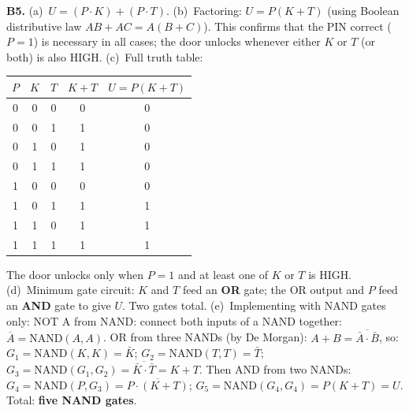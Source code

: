 \textbf{B5.}
(a)~$U=(P\cdot K)+(P\cdot T)$. \quad
(b)~Factoring: $U=P(K+T)$
(using Boolean distributive law $AB+AC=A(B+C)$).
This confirms that the PIN correct ($P=1$) is
necessary in all cases; the door unlocks whenever
either $K$ or $T$ (or both) is also HIGH. \quad
(c)~Full truth table:
\begin{center}
\begin{tabular}{ccc|c|c}
$P$ & $K$ & $T$ & $K+T$ & $U=P(K+T)$\\
\hline
0 & 0 & 0 & 0 & 0\\
0 & 0 & 1 & 1 & 0\\
0 & 1 & 0 & 1 & 0\\
0 & 1 & 1 & 1 & 0\\
1 & 0 & 0 & 0 & 0\\
1 & 0 & 1 & 1 & 1\\
1 & 1 & 0 & 1 & 1\\
1 & 1 & 1 & 1 & 1\\
\end{tabular}
\end{center}
The door unlocks only when $P=1$ and at least one of
$K$ or $T$ is HIGH. \quad
(d)~Minimum gate circuit: $K$ and $T$ feed an
\textbf{OR} gate; the OR output and $P$ feed an
\textbf{AND} gate to give $U$. Two gates total. \quad
(e)~Implementing with NAND gates only:
NOT A from NAND: connect both inputs of a NAND
together: $\overline{A}=\text{NAND}(A,A)$.
OR from three NANDs (by De Morgan):
$A+B=\overline{\bar{A}\cdot\bar{B}}$,
so:
$G_1=\text{NAND}(K,K)=\bar{K}$;
$G_2=\text{NAND}(T,T)=\bar{T}$;
$G_3=\text{NAND}(G_1,G_2)=\overline{\bar{K}\cdot\bar{T}}=K+T$.
Then AND from two NANDs:
$G_4=\text{NAND}(P,G_3)=\overline{P\cdot(K+T)}$;
$G_5=\text{NAND}(G_4,G_4)=P(K+T)=U$.
Total: \textbf{five NAND gates}.

\endgroup

\normalsize

\normalsize
